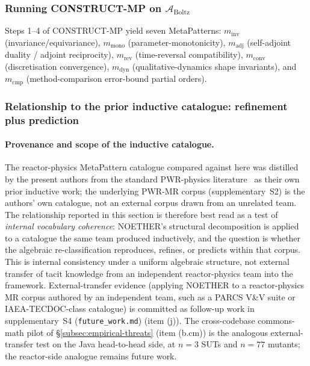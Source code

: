 \documentclass[manuscript]{acmart}
\begin{document}
\subsubsection{Running CONSTRUCT-MP on \texorpdfstring{$\mathcal{A}_{\mathrm{Boltz}}$}{A\_Boltz}}

Steps 1--4 of CONSTRUCT-MP yield seven MetaPatterns: $m_{\mathrm{inv}}$ (invariance/equivariance), $m_{\mathrm{mono}}$ (parameter-monotonicity), $m_{\mathrm{adj}}$ (self-adjoint duality / adjoint reciprocity), $m_{\mathrm{rev}}$ (time-reversal compatibility), $m_{\mathrm{conv}}$ (discretisation convergence), $m_{\mathrm{dyn}}$ (qualitative-dynamics shape invariants), and $m_{\mathrm{cmp}}$ (method-comparison error-bound partial orders).

\subsubsection{Relationship to the prior inductive catalogue: refinement plus prediction}
\label{subsec:reactor-mapping}

\paragraph{Provenance and scope of the inductive catalogue.}
The reactor-physics MetaPattern catalogue compared against here was distilled by the present authors from the standard PWR-physics literature~\cite{BellGlasstone1970, LewisMiller1993} as their own prior inductive work; the underlying PWR-MR corpus (supplementary~S2) is the authors' own catalogue, not an external corpus drawn from an unrelated team. The relationship reported in this section is therefore best read as a test of \emph{internal vocabulary coherence}: NOETHER's structural decomposition is applied to a catalogue the same team produced inductively, and the question is whether the algebraic re-classification reproduces, refines, or predicts within that corpus. This is internal consistency under a uniform algebraic structure, not external transfer of tacit knowledge from an independent reactor-physics team into the framework. External-transfer evidence (applying NOETHER to a reactor-physics MR corpus authored by an independent team, such as a PARCS V\&V suite or IAEA-TECDOC-class catalogue) is committed as follow-up work in supplementary~S4 (\texttt{future\_work.md}) (item (j)). The cross-codebase commons-math pilot of \S\ref{subsec:empirical-threats} (item (b.cm)) is the analogous external-transfer test on the Java head-to-head side, at $n = 3$ SUTs and $n = 77$ mutants; the reactor-side analogue remains future work.
\end{document}
